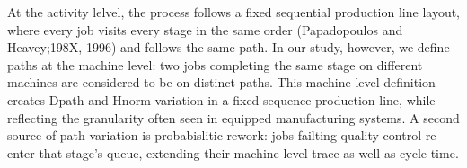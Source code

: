 \documentclass[
]{ceurart}
\begin{document}
\begin{figure}[htbp]
{
    }
\end{figure}


At the activity lelvel, the process follows a fixed sequential production line layout, where every job visits every stage in the same order (Papadopoulos and Heavey;198X, 1996) and
follows the same path. In our study, however, we define paths at the machine level: two jobs completing the same stage on different machines are considered to be on distinct paths. This machine-level definition creates Dpath and Hnorm variation in a fixed sequence production line, while reflecting the granularity often seen in equipped manufacturing systems. 
A second source of path variation is probabislitic rework: jobs failting quality control re-enter that stage's queue, extending their machine-level trace as well as cycle time.

\end{document}
